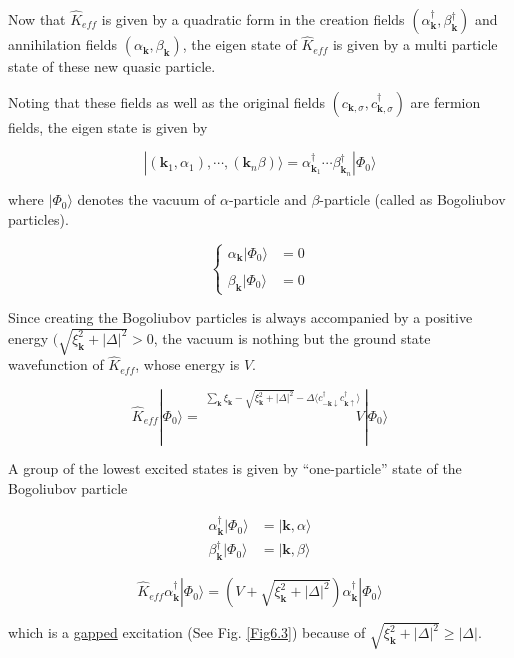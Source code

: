Now that $\hat{K}_{eff}$ is given by a quadratic form in the creation fields $(\alpha_{\bm{k}}^\dagger, \beta_{\bm{k}}^\dagger)$ and annihilation fields $(\alpha_{\bm{k}}, \beta_{\bm{k}})$, the eigen state of $\hat{K}_{eff}$ is given by a multi particle state of these new quasic particle. 

Noting that these fields as well as the original fields $(c_{\bm{k},\sigma}, c_{\bm{k},\sigma}^\dagger)$ are fermion fields, the eigen state is given by 

\[|(\bm{k}_1,\alpha_1),\cdots,(\bm{k}_n\beta)\rangle = \alpha_{\bm{k}_1}^\dagger \cdots \beta_{\bm{k}_n}^\dagger|\Phi_0\rangle \]

where $|\Phi_0\rangle$ denotes the vacuum of $\alpha$-particle and $\beta$-particle (called as Bogoliubov particles). 

\[\begin{cases}
\alpha_{\bm{k}}|\Phi_0\rangle &= 0\\
\ & \ \\
\beta_{\bm{k}}|\Phi_0\rangle &= 0
\end{cases}\]

Since creating the Bogoliubov particles is always accompanied by a positive energy $(\sqrt{\xi_{\bm{k}}^2+|\Delta|^2}>0$, the vacuum is nothing but the ground state wavefunction of $\hat{K}_{eff}$, whose energy is $V$. 

\[\hat{K}_{eff}|\Phi_0\rangle = \overset{\sum_{\bm{k}}\xi_{\bm{k}}-\sqrt{\xi_{\bm{k}}^2+|\Delta|^2}-\Delta\langle c_{-\bm{k}\downarrow}^\dagger c_{\bm{k}\uparrow}^\dagger\rangle}{\quad\quad\quad\quad\quad\quad\quad\quad\quad\quad\quad V}|\Phi_0\rangle \]

A group of the lowest excited states is given by ``one-particle'' state of the Bogoliubov particle

\[\begin{split}
\alpha_{\bm{k}}^\dagger|\Phi_0\rangle &= |\bm{k},\alpha\rangle\\
\beta_{\bm{k}}^\dagger|\Phi_0\rangle &= |\bm{k}, \beta\rangle
\end{split}\]

\[\hat{K}_{eff} \alpha_{\bm{k}}^\dagger|\Phi_0\rangle = (V+\sqrt{\xi_{\bm{k}}^2+|\Delta|^2})\alpha_{\bm{k}}^\dagger|\Phi_0\rangle \]

which is a \uline{gapped} excitation (See Fig. \ref{Fig6.3}) because of $\sqrt{\xi_{\bm{k}}^2+|\Delta|^2}\ge|\Delta|$. 


